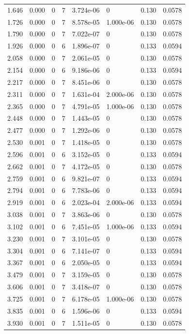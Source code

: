 \documentclass[preview]{standalone}
\begin{document}
{{\begin{tabular}{L{1.2cm}C{1.2cm} C{0.3cm}C{0.5cm} C{1.4cm}C{1.4cm} C{1.4cm}C{1.4cm}}
  1.646  &  0.000  & 0     &  7 &  3.724e-06  & 0  & 0.130 &  0.0578   \\ 
  1.726  &  0.000  & 0     &  7 &  8.578e-05  & 1.000e-06  & 0.130 &  0.0578   \\ 
  1.790  &  0.000  & 0     &  7 &  7.022e-07  & 0  & 0.130 &  0.0578   \\ 
  1.926  &  0.000  & 0     &  6 &  1.896e-07  & 0  & 0.133 &  0.0594   \\ 
  2.058  &  0.000  & 0     &  7 &  2.061e-05  & 0  & 0.130 &  0.0578   \\ 
  2.154  &  0.000  & 0     &  6 &  9.186e-06  & 0  & 0.133 &  0.0594   \\ 
  2.217  &  0.000  & 0     &  7 &  8.451e-06  & 0  & 0.130 &  0.0578   \\ 
  2.311  &  0.000  & 0     &  7 &  1.631e-04  & 2.000e-06  & 0.130 &  0.0578   \\ 
  2.365  &  0.000  & 0     &  7 &  4.791e-05  & 1.000e-06  & 0.130 &  0.0578   \\ 
  2.448  &  0.000  & 0     &  7 &  1.443e-05  & 0  & 0.130 &  0.0578   \\ 
  2.477  &  0.000  & 0     &  7 &  1.292e-06  & 0  & 0.130 &  0.0578   \\ 
  2.530  &  0.001  & 0     &  7 &  1.418e-05  & 0  & 0.130 &  0.0578   \\ 
  2.596  &  0.001  & 0     &  6 &  3.152e-05  & 0  & 0.133 &  0.0594   \\ 
  2.662  &  0.001  & 0     &  7 &  4.172e-05  & 0  & 0.130 &  0.0578   \\ 
  2.759  &  0.001  & 0     &  6 &  9.821e-07  & 0  & 0.133 &  0.0594   \\ 
  2.794  &  0.001  & 0     &  6 &  7.783e-06  & 0  & 0.133 &  0.0594   \\ 
  2.919  &  0.001  & 0     &  6 &  2.023e-04  & 2.000e-06  & 0.133 &  0.0594   \\ 
  3.038  &  0.001  & 0     &  7 &  3.863e-06  & 0  & 0.130 &  0.0578   \\ 
  3.102  &  0.001  & 0     &  6 &  7.451e-05  & 1.000e-06  & 0.133 &  0.0594   \\ 
  3.230  &  0.001  & 0     &  7 &  3.101e-05  & 0  & 0.130 &  0.0578   \\ 
  3.304  &  0.001  & 0     &  6 &  7.141e-07  & 0  & 0.133 &  0.0594   \\ 
  3.367  &  0.001  & 0     &  6 &  2.050e-05  & 0  & 0.133 &  0.0594   \\ 
  3.479  &  0.001  & 0     &  7 &  3.159e-05  & 0  & 0.130 &  0.0578   \\ 
  3.606  &  0.001  & 0     &  7 &  3.418e-07  & 0  & 0.130 &  0.0578   \\ 
  3.725  &  0.001  & 0     &  7 &  6.178e-05  & 1.000e-06  & 0.130 &  0.0578   \\ 
  3.835  &  0.001  & 0     &  6 &  1.596e-06  & 0  & 0.133 &  0.0594   \\ 
  3.930  &  0.001  & 0     &  7 &  1.511e-05  & 0  & 0.130 &  0.0578   \\ 
\hline 
\end{tabular} 

}}
\end{document}
